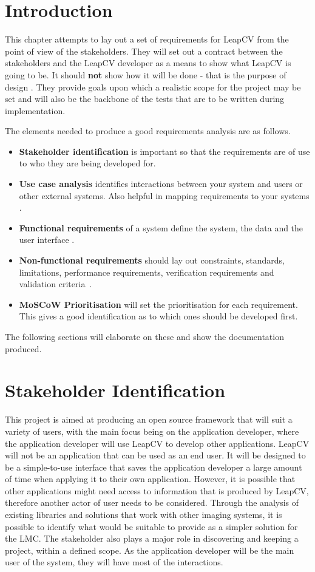 \documentclass[11pt,oneside]{report}
\begin{document}
	\section{Introduction}
	This chapter attempts to lay out a set of requirements for LeapCV from the point of view of the stakeholders.
	They will set out a contract between the stakeholders and the LeapCV developer as a means to show what LeapCV is going to be. It should \textbf{not} show how it will be done - that is the purpose of design \cite{book:dawson}.
	They provide goals upon which a realistic scope for the project may be set and will also be the backbone of the tests that are to be written during implementation.
	
	The elements needed to produce a good requirements analysis are as follows.
	\begin{itemize}
		\item \textbf{Stakeholder identification} is important so that the requirements are of use to who they are being developed for.
		\item \textbf{Use case analysis} identifies interactions between your system and users or other external systems. Also helpful in mapping requirements to your systems \cite{book:uml}.
		\item \textbf{Functional requirements} of a system define the system, the data and the user interface \cite{book:dawson}.
		\item \textbf{Non-functional requirements} should lay out constraints, standards, limitations, performance requirements, verification requirements and validation criteria~\cite{book:dawson}.
		\item \textbf{MoSCoW Prioritisation} will set the prioritisation for each requirement. This gives a good identification as to which ones should be developed first.
	\end{itemize}
	The following sections will elaborate on these and show the documentation produced. 
		
		\section{Stakeholder Identification}
			This project is aimed at producing an open source framework that will suit a variety of users, with the main focus being on the application developer, where the application developer will use LeapCV to develop other applications.
			LeapCV will not be an application that can be used as an end user.
			It will be designed to be a simple-to-use interface that saves the application developer a large amount of time when applying it to their own application.
			However, it is possible that other applications might need access to information that is produced by LeapCV, therefore another actor of user needs to be considered.
			Through the analysis of existing libraries and solutions that work with other imaging systems, it is possible to identify what would be suitable to provide as a simpler solution for the LMC.
			The stakeholder also plays a major role in discovering and keeping a project, within a defined scope.
			As the application developer will be the main user of the system, they will	have most of the interactions.
			
\end{document}
